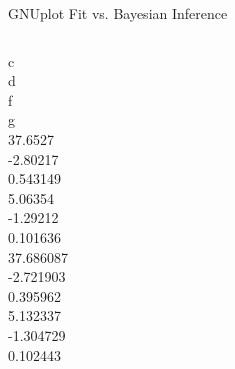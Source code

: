 \documentclass[10pt]{beamer}
\begin{document}
\begin{frame}{GNUplot Fit vs. Bayesian Inference}
\begin{columns}[c]
		c \\
		d \\
		f \\
		g  
 		 \\
		37.6527 \\
		-2.80217 \\
		0.543149 \\
		5.06354 \\
		-1.29212 \\
		0.101636 
 		 \\
		37.686087 \\
		-2.721903 \\
		0.395962 \\
		5.132337 \\
		-1.304729 \\
		0.102443
	\end{columns}
\end{frame}
\end{document}
